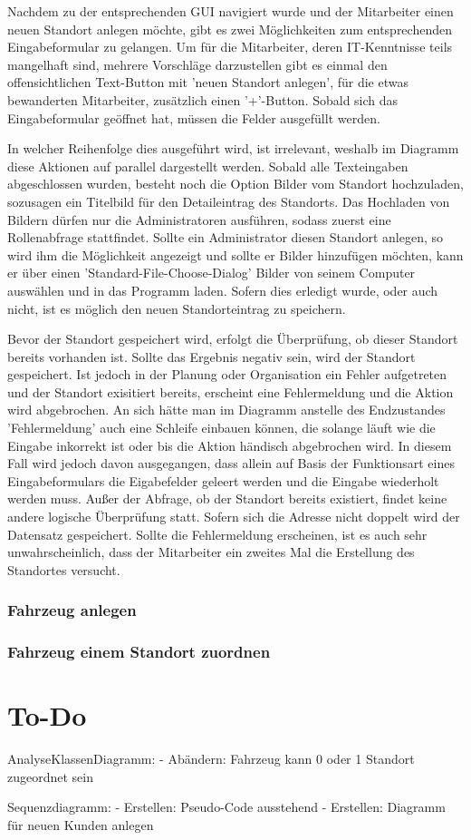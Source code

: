 Nachdem zu der entsprechenden GUI navigiert wurde und der Mitarbeiter einen neuen Standort anlegen möchte, gibt es zwei Möglichkeiten zum entsprechenden Eingabeformular zu gelangen. Um für die Mitarbeiter, deren IT-Kenntnisse teils mangelhaft sind, mehrere Vorschläge darzustellen gibt es einmal den offensichtlichen Text-Button mit 'neuen Standort anlegen', für die etwas bewanderten Mitarbeiter, zusätzlich einen '+'-Button. Sobald sich das Eingabeformular geöffnet hat, müssen die Felder ausgefüllt werden. 


In welcher Reihenfolge dies ausgeführt wird, ist irrelevant, weshalb im Diagramm diese Aktionen auf parallel dargestellt werden. Sobald alle Texteingaben abgeschlossen wurden, besteht noch die Option Bilder vom Standort hochzuladen, sozusagen ein Titelbild für den Detaileintrag des Standorts. Das Hochladen von Bildern dürfen nur die Administratoren ausführen, sodass zuerst eine Rollenabfrage stattfindet. Sollte ein Administrator diesen Standort anlegen, so wird ihm die Möglichkeit angezeigt und sollte er Bilder hinzufügen möchten, kann er über einen 'Standard-File-Choose-Dialog' Bilder von seinem Computer auswählen und in das Programm laden. Sofern dies erledigt wurde, oder auch nicht, ist es möglich den neuen Standorteintrag zu speichern. 


Bevor der Standort gespeichert wird, erfolgt die Überprüfung, ob dieser Standort bereits vorhanden ist. Sollte das Ergebnis negativ sein, wird der Standort gespeichert. Ist jedoch in der Planung oder Organisation ein Fehler aufgetreten und der Standort exisitiert bereits, erscheint eine Fehlermeldung und die Aktion wird abgebrochen. An sich hätte man im Diagramm anstelle des Endzustandes 'Fehlermeldung' auch eine Schleife einbauen können, die solange läuft wie die Eingabe inkorrekt ist oder bis die Aktion händisch abgebrochen wird. In diesem Fall wird jedoch davon ausgegangen, dass allein auf Basis der Funktionsart eines Eingabeformulars die Eigabefelder geleert werden und die Eingabe wiederholt werden muss. Außer der Abfrage, ob der Standort bereits existiert, findet keine andere logische Überprüfung statt. Sofern sich die Adresse nicht doppelt wird der Datensatz gespeichert. Sollte die Fehlermeldung erscheinen, ist es auch sehr unwahrscheinlich, dass der Mitarbeiter ein zweites Mal die Erstellung des Standortes versucht. 
\newpage

\subsection{Fahrzeug anlegen}

\newpage

\subsection{Fahrzeug einem Standort zuordnen}


\chapter{To-Do}

AnalyseKlassenDiagramm: 
- Abändern: Fahrzeug kann 0 oder 1 Standort zugeordnet sein

Sequenzdiagramm:
- Erstellen: Pseudo-Code ausstehend
- Erstellen: Diagramm für neuen Kunden anlegen